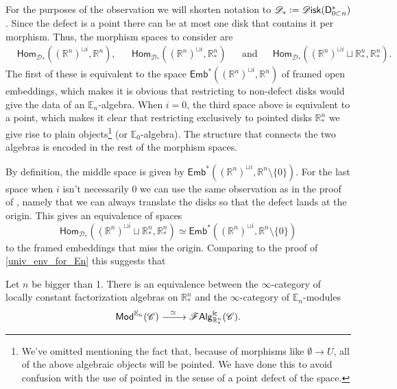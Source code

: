 \documentclass[../text]{subfiles}
\begin{document}
\begin{observation}
    For the purposes of the observation we will shorten notation to $\mathscr{D}_* := \disk (\mathsf{D}_{0 \subset n}^*)$. Since the defect is a point there can be at most one disk that contains it per morphism. Thus, the morphism spaces to consider are
    \begin{align}
        &\mathsf{Hom}_{\mathscr{D}_*} ((\mathbb{R}^n)^{\sqcup i}, \mathbb{R}^n),& &\mathsf{Hom}_{\mathscr{D}_*} ((\mathbb{R}^n)^{\sqcup i}, \mathbb{R}^n_*)& &\mathrm{and}& &\mathsf{Hom}_{\mathscr{D}_*} ((\mathbb{R}^n)^{\sqcup i} \sqcup \mathbb{R}^n_*, \mathbb{R}^n_*).&
    \end{align}
    The first of these is equivalent to the space $\mathsf{Emb}^*((\mathbb{R}^n)^{\sqcup i}, \mathbb{R}^n)$ of framed open embeddings, which makes it is obvious that restricting to non-defect disks would give the data of an $\mathbb{E}_n$-algebra. When $i=0$, the third space above is equivalent to a point, which makes it clear that restricting exclusively to pointed disks $\mathbb{R}^n_*$ we give rise to plain objects\footnote{We've omitted mentioning the fact that, because of morphisms like $\emptyset \xrightarrow{} U$, all of the above algebraic objects will be pointed. We have done this to avoid confusion with the use of pointed in the sense of a point defect of the space.} (or $\mathbb{E}_0$-algebra). The structure that connects the two algebras is encoded in the rest of the morphism spaces. 

    By definition, the middle space is given by $\mathsf{Emb}^* ((\mathbb{R}^n)^{\sqcup i}, \mathbb{R}^n \setminus \{0\})$. For the last space when $i$ isn't necessarily 0 we can use the same observation as in the proof of \cite[prop.3.16]{francis2013}, namely that we can always translate the disks so that the defect lands at the origin. This gives an equivalence of spaces
    \begin{equation}
        \mathsf{Hom}_{\mathscr{D}_*} ((\mathbb{R}^n)^{\sqcup i} \sqcup \mathbb{R}^n_*, \mathbb{R}^n_*) \simeq \mathsf{Emb}^* ((\mathbb{R}^n)^{\sqcup i}, \mathbb{R}^n \setminus \{0\})
    \end{equation}
    to the framed embeddings that miss the origin. Comparing to the proof of \cref{univ_env_for_En} this suggests that
\end{observation}

\begin{theorem}
    Let $n$ be bigger than 1. There is an equivalence between the $\infty$-category of locally constant factorization algebras on $\mathbb{R}^n_*$ and the $\infty$-category of $\mathbb{E}_n$-modules
    \begin{equation}
        \mathsf{Mod}^{\mathbb{E}_n} (\mathscr{C}) \xrightarrow{\ \ \simeq \ \ } \mathscr{F} \mathsf{Alg}^{\mathsf{lc}}_{\mathbb{R}^n_*} (\mathscr{C}).
    \end{equation} 
\end{theorem}
\end{document}

